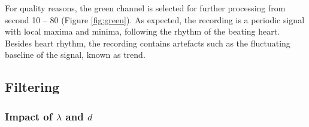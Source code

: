 \documentclass[twocolumn]{bmcart}%
\begin{document}
For quality reasons, the green channel is selected for further processing from second 10 -- 80 (Figure \ref{fig:green}). 
As expected, the recording is a periodic signal with local maxima and minima, following the rhythm of the beating heart. 
Besides heart rhythm, the recording contains artefacts such as the fluctuating baseline of the signal, known as trend. 

\subsection*{Filtering}
\subsubsection*{Impact of $\lambda$ and $d$}
\begin{figure}[p] 
  \begin{center}


\end{center}
\end{figure}
\end{document}
